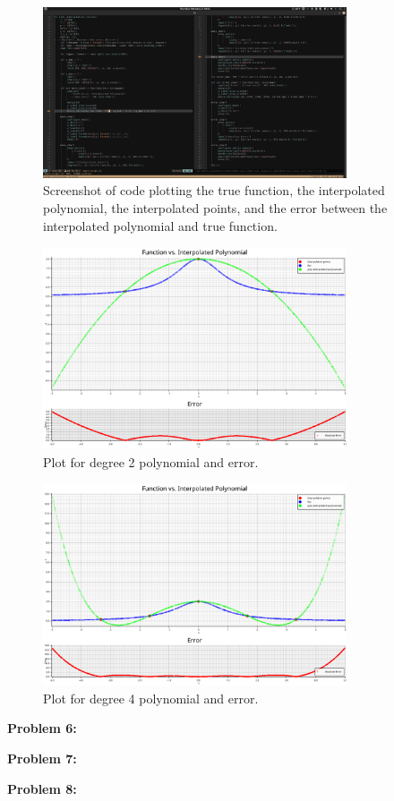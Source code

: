 \documentclass[12pt, letterpaper]{article}
\theoremstyle{nonumberplain}
\begin{document}
\begin{figure}[!htbp]
	\centering
	\includegraphics[width=0.8\textwidth]{numhw2q5_plotfunction.png}
	\caption{Screenshot of code plotting the true function, the interpolated polynomial, the interpolated points, and the error between the interpolated polynomial and true function.}
\end{figure}

\begin{figure}[!htbp]
	\centering
	\includegraphics[width=0.8\textwidth]{interpolation_plot_degree_2.png}
	\caption{Plot for degree 2 polynomial and error.}
\end{figure}

\begin{figure}[!htbp]
	\centering
	\includegraphics[width=0.8\textwidth]{interpolation_plot_degree_4.png}
	\caption{Plot for degree 4 polynomial and error.}
\end{figure}

\clearpage

\hspace{18pt}\textbf{Problem 6:} \medskip


\hspace{18pt}\textbf{Problem 7:} \medskip


\hspace{18pt}\textbf{Problem 8:} \medskip

\end{document}
